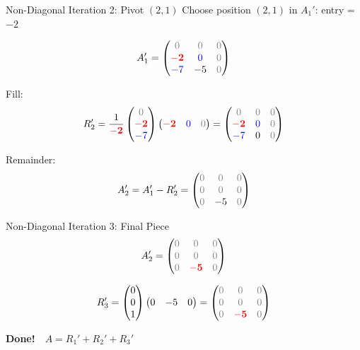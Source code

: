 \documentclass[10pt]{beamer}
\theoremstyle{definition}
\newcommand{\pvt}[1]{{\color{red}\mathbf{#1}}}       %
\newcommand{\crs}[1]{{\color{blue}#1}}                %
\newcommand{\rem}[1]{{\color{gray}#1}}                %
\newcommand{\x}[1]{\alert{\textbf{#1}}}
\begin{document}
\begin{frame}{Non-Diagonal Iteration 2: Pivot $(2,1)$}
Choose position $(2,1)$ in $A_1'$: entry = $-2$

$$A_1' = \begin{pmatrix}
\rem{0} & \rem{0} & \rem{0} \\
\pvt{-2} & \crs{0} & \rem{0} \\
\crs{-7} & -5 & \rem{0}
\end{pmatrix}$$

\vfill
Fill:
$$R_2' = \frac{1}{\pvt{-2}}
\begin{pmatrix} \rem{0} \\ \pvt{-2} \\ \crs{-7} \end{pmatrix}
\begin{pmatrix} \pvt{-2} & \crs{0} & \rem{0} \end{pmatrix}
= \begin{pmatrix}
\rem{0} & \rem{0} & \rem{0} \\
\pvt{-2} & \crs{0} & \rem{0} \\
\crs{-7} & 0 & \rem{0}
\end{pmatrix}$$

\vfill
Remainder:
$$A_2' = A_1' - R_2' = \begin{pmatrix}
\rem{0} & \rem{0} & \rem{0} \\
\rem{0} & \rem{0} & \rem{0} \\
\rem{0} & -5 & \rem{0}
\end{pmatrix}$$
\end{frame}

\begin{frame}{Non-Diagonal Iteration 3: Final Piece}
$$A_2' = \begin{pmatrix}
\rem{0} & \rem{0} & \rem{0} \\
\rem{0} & \rem{0} & \rem{0} \\
\rem{0} & \pvt{-5} & \rem{0}
\end{pmatrix}$$

\vfill
$$R_3' = \begin{pmatrix} 0 \\ 0 \\ 1 \end{pmatrix}
\begin{pmatrix} 0 & -5 & 0 \end{pmatrix}
= \begin{pmatrix}
\rem{0} & \rem{0} & \rem{0} \\
\rem{0} & \rem{0} & \rem{0} \\
\rem{0} & \pvt{-5} & \rem{0}
\end{pmatrix}$$

\x{Done!}\ \ $A = R_1' + R_2' + R_3'$
\end{frame}
\end{document}
